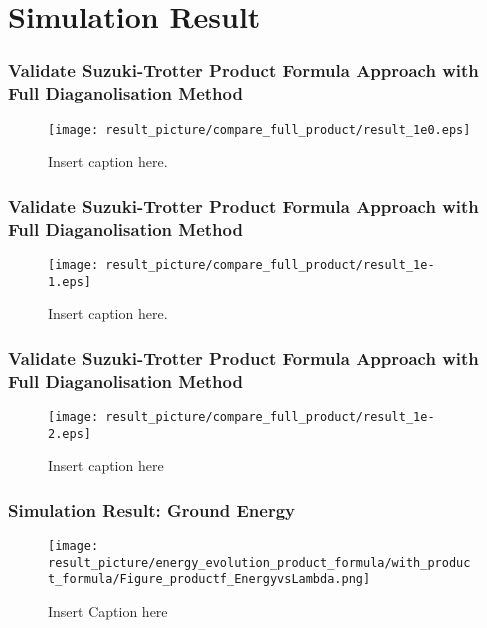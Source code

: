 \documentclass{beamer}
\begin{document}
\section{Simulation Result}
\begin{frame}
		\frametitle{Validate Suzuki-Trotter Product Formula Approach with Full Diaganolisation Method}
		\begin{figure}[h]
			\centering
			\texttt{[image: result\_picture/compare\_full\_product/result\_1e0.eps]}
			\caption{Insert caption here.}
			
		\end{figure}
\end{frame}


\begin{frame}
	\frametitle{Validate Suzuki-Trotter Product Formula Approach with Full Diaganolisation Method}
	\begin{figure}[h]
		\centering
		\texttt{[image: result\_picture/compare\_full\_product/result\_1e-1.eps]}
		\caption{Insert caption here.}
		
	\end{figure}
\end{frame}


\begin{frame}
	\frametitle{Validate Suzuki-Trotter Product Formula Approach with Full Diaganolisation Method}
	\begin{figure}[h]
		\centering
		\texttt{[image: result\_picture/compare\_full\_product/result\_1e-2.eps]}
		\caption{Insert caption here}
		
	\end{figure}
\end{frame}


\begin{frame}
	\frametitle{Simulation Result: Ground Energy}
	\begin{figure}
		\centering
		\texttt{[image: result\_picture/energy\_evolution\_product\_formula/with\_product\_formula/Figure\_productf\_EnergyvsLambda.png]}
		\caption{Insert Caption here}
	\end{figure}
\end{frame}
\end{document}
